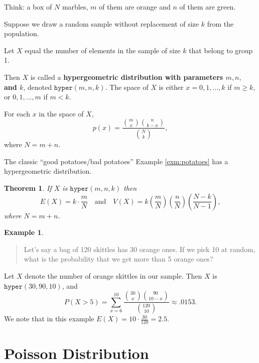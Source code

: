 \documentclass[
]{book}
\newtheorem{theorem}{Theorem}[chapter]
\theoremstyle{definition}
\theoremstyle{definition}
\newtheorem{example}{Example}[chapter]
\theoremstyle{definition}
\theoremstyle{definition}
\theoremstyle{remark}
\begin{document}
Think: a box of \(N\) marbles, \(m\) of them are orange and \(n\) of them are green.

Suppose we draw a random sample without replacement of size \(k\) from the population.

Let \(X\) equal the number of elements in the sample of size \(k\) that belong to group 1.

Then \(X\) is called a \textbf{hypergeometric distribution with parameters \(m, n,\) and \(k\)}, denoted \(\texttt{hyper}(m,n,k)\). The space of \(X\) is either
\(x = 0, 1, \ldots, k\) if \(m \geq k\), or \(0, 1, \ldots, m\) if \(m < k\).

For each \(x\) in the space of \(X\),
\[p(x) = \frac{\binom{m}{x}\binom{n}{k-x}}{\binom{N}{k}},\] where \(N = m + n\).

The classic ``good potatoes/bad potatoes'' Example \ref{exm:potatoes} has a hypergeometric distribution.

\begin{theorem}
\protect\hypertarget{thm:hypergeometric-EandV}{}\label{thm:hypergeometric-EandV}If \(X\) is \(\texttt{hyper}(m,n,k)\) then \[E(X) = k\cdot\frac{m}{N}~~~\text{ and }~~~ V(X) = k \left(\frac{m}{N}\right)\left(\frac{n}{N}\right)\left(\frac{N-k}{N-1}\right),\] where \(N = m + n\).
\end{theorem}

\begin{example}
\protect\hypertarget{exm:hyper-skittles}{}\label{exm:hyper-skittles}\leavevmode

\begin{quote}
Let's say a bag of 120 skittles has 30 orange ones. If we pick 10 at random, what is the probability that we get more than 5 orange ones?
\end{quote}

Let \(X\) denote the number of orange skittles in our sample. Then \(X\) is \(\texttt{hyper}(30,90,10)\), and
\[P(X>5) = \sum_{x=6}^{10} \frac{\binom{30}{x}\binom{90}{10-x}}{\binom{120}{10}} \approx .0153.\]
We note that in this example \(E(X) = 10 \cdot \frac{30}{120} = 2.5.\)

\end{example}

\section{Poisson Distribution}\label{poisson}
\end{document}
